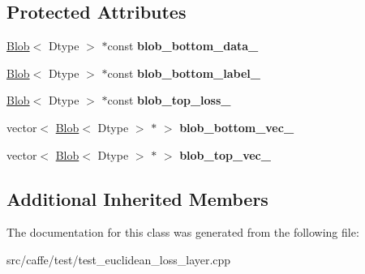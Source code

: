 \subsection*{Protected Attributes}
\begin{DoxyCompactItemize}
\item 
\mbox{\label{classcaffe_1_1_euclidean_loss_layer_test_a072b8bf3ed99255414c2f30fc41fadc9}} 
\mbox{\hyperlink{classcaffe_1_1_blob}{Blob}}$<$ Dtype $>$ $\ast$const {\bfseries blob\+\_\+bottom\+\_\+data\+\_\+}
\item 
\mbox{\label{classcaffe_1_1_euclidean_loss_layer_test_a2e6119f59b8a1fc35a3ff6e2672244cc}} 
\mbox{\hyperlink{classcaffe_1_1_blob}{Blob}}$<$ Dtype $>$ $\ast$const {\bfseries blob\+\_\+bottom\+\_\+label\+\_\+}
\item 
\mbox{\label{classcaffe_1_1_euclidean_loss_layer_test_ae91850762a9ed8f5e7124e10af294e0b}} 
\mbox{\hyperlink{classcaffe_1_1_blob}{Blob}}$<$ Dtype $>$ $\ast$const {\bfseries blob\+\_\+top\+\_\+loss\+\_\+}
\item 
\mbox{\label{classcaffe_1_1_euclidean_loss_layer_test_a262db2297600d307c0e93cd3a8ab3c5b}} 
vector$<$ \mbox{\hyperlink{classcaffe_1_1_blob}{Blob}}$<$ Dtype $>$ $\ast$ $>$ {\bfseries blob\+\_\+bottom\+\_\+vec\+\_\+}
\item 
\mbox{\label{classcaffe_1_1_euclidean_loss_layer_test_af7ffb4c11e797bb715117253b6b8b37b}} 
vector$<$ \mbox{\hyperlink{classcaffe_1_1_blob}{Blob}}$<$ Dtype $>$ $\ast$ $>$ {\bfseries blob\+\_\+top\+\_\+vec\+\_\+}
\end{DoxyCompactItemize}
\subsection*{Additional Inherited Members}


The documentation for this class was generated from the following file\+:\begin{DoxyCompactItemize}
\item 
src/caffe/test/test\+\_\+euclidean\+\_\+loss\+\_\+layer.\+cpp\end{DoxyCompactItemize}
